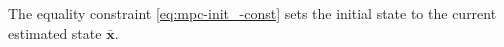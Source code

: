 The equality constraint \eqref{eq:mpc-init_-const} sets the initial state to the current estimated state $\bar{\mathbf{x}}$.

